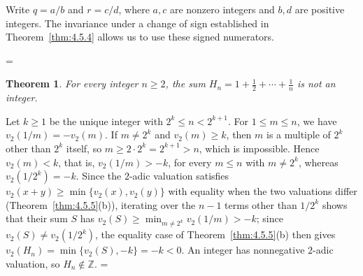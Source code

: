\documentclass[11pt]{article}
\makeatletter
\let\nt@closedisplay\]
\def\nt@guardedclose{\@ifnextchar\par{\nt@closeafterpar}{\@ifnextchar\end{\postdisplaypenalty\@M\nt@closedisplay}{\nt@closedisplay}}}
\def\nt@closeafterpar\par{\@ifnextchar\par{\nt@closeafterpar}{\@ifnextchar\end{\postdisplaypenalty\@M\nt@closedisplay\par}{\nt@closedisplay\par}}}
\renewenvironment{proof}[1][\proofname]{\par
  \pushQED{\qed}\normalfont\topsep\medskipamount\edef\nt@afterproof{\@endparpenalty=\the\@endparpenalty\relax}\@beginparpenalty\@M\@endparpenalty\@M\let\]\nt@guardedclose\trivlist\item[]\textit{#1\@addpunct{.}} \ignorespaces}{\ifvmode\addpenalty\@M\fi\popQED\nt@afterproof\endtrivlist\@endpefalse}
\theoremstyle{ntstyle}
\newtheorem{theorem}{Theorem}[subsection]
\makeatother
\begin{document}
\begin{proof} Write $q=a/b$ and $r=c/d$, where $a,c$ are nonzero
  integers and $b,d$ are positive integers. The invariance under a change of sign established in
  Theorem~\ref{thm:4.5.4} allows us to use these signed numerators.
\end{proof}

\begin{theorem}\label{thm:4.5.6}
  For every integer $n\ge2$, the sum $H_n=1+\tfrac12+\cdots+\tfrac1n$ is not an integer.

\end{theorem}

\begin{proof} Let $k\ge1$ be the unique integer with
  $2^{k}\le n<2^{k+1}$. For $1\le m\le n$, we have $v_2(1/m)=-v_2(m)$. If
  $m\neq2^{k}$ and $v_2(m)\ge k$, then $m$ is a multiple of $2^{k}$ other than
  $2^{k}$ itself, so $m\ge2\cdot2^{k}=2^{k+1}>n$, which is impossible. Hence
  $v_2(m)<k$, that is, $v_2(1/m)>-k$, for every $m\le n$ with $m\neq2^{k}$,
  whereas $v_2(1/2^{k})=-k$. Since the $2$-adic valuation satisfies
  $v_2(x+y)\ge\min\{v_2(x),v_2(y)\}$ with equality when the two valuations differ
  (Theorem~\ref{thm:4.5.5}(b)), iterating over the $n-1$ terms other than
  $1/2^{k}$ shows that their sum $S$ has
  $v_2(S)\ge\min_{m\neq2^{k}}v_2(1/m)>-k$; since $v_2(S)\neq v_2(1/2^{k})$,
  the equality case of Theorem~\ref{thm:4.5.5}(b) then gives
  $v_2(H_n)=\min\{v_2(S),-k\}=-k<0$. An integer has nonnegative
  $2$-adic valuation, so $H_n\notin\mathbb{Z}$.
\end{proof}
\end{document}
